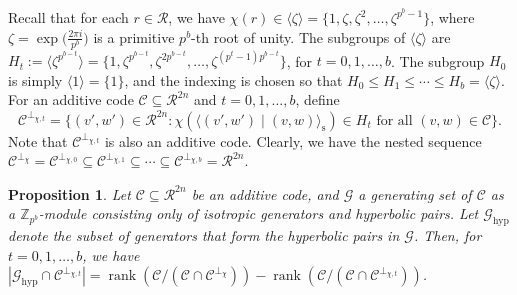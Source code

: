 \documentclass{article}
\DeclareMathOperator{\rank}{rank}
\newtheorem{prop}{Proposition}[section]
\theoremstyle{remark}
\theoremstyle{definition}
\numberwithin{equation}{section}
\begin{document}
Recall that for each $r \in \mathcal{R}$, we have $\chi(r)\in \langle \zeta \rangle=\{1,\zeta,\zeta^2,\ldots,\zeta^{p^b-1}\}$, where $\zeta = \exp\bigl(\frac{2 \pi i}{p^b}\bigr)$ is a primitive $p^b$-th root of unity. The subgroups of $\langle \zeta \rangle$ are $H_t := \langle \zeta^{p^{b-t}} \rangle = \{1,\zeta^{p^{b-t}},\zeta^{2p^{b-t}},\ldots,\zeta^{(p^{t}-1)p^{b-t}}\}$, for $t = 0,1,\ldots,b$.  The subgroup $H_0$ is simply $\langle 1 \rangle = \{1\}$, and the indexing is chosen so that $H_0 \le H_1 \leq \cdots \le H_b = \langle \zeta \rangle$. For an additive code $\mathcal{C} \subseteq \mathcal{R}^{2n}$ and $t = 0,1,\ldots,b$, define
\begin{equation}
\mathcal{C}^{\perp_{\chi,t}} = \{(v',w') \in \mathcal{R}^{2n}: \chi(\langle(v',w') \mid (v,w) \rangle_{\text{s}}) \in H_t \text{ for all } (v,w) \in \mathcal{C}\}.
\label{def:perp_t}
\end{equation}
Note that $\mathcal{C}^{\perp_{\chi,t}}$ is also an additive code. Clearly, we have the nested sequence $\mathcal{C}^{\perp_\chi} = \mathcal{C}^{\perp_{\chi,0}} \subseteq \mathcal{C}^{\perp_{\chi,1}} \subseteq \cdots \subseteq \mathcal{C}^{\perp_{\chi,b}} = \mathcal{R}^{2n}$.


\begin{prop}\label{prop:count} 
Let $\mathcal{C} \subseteq \mathcal{R}^{2n}$ be an additive code, and $\mathcal{G}$ a generating set of $\mathcal{C}$ as a $\mathbb{Z}_{p^b}$-module consisting only of isotropic generators and hyperbolic pairs. Let $\mathcal{G}_{\mathrm{hyp}}$ denote the subset of generators that form the hyperbolic pairs in $\mathcal{G}$. Then, for $t = 0,1,\ldots,b$, we have $\left|\mathcal{G}_{\mathrm{hyp}} \cap \mathcal{C}^{\perp_{\chi,t}}\right| = \rank(\mathcal{C} / (\mathcal{C} \cap \mathcal{C}^{\perp_{\chi}})) - \rank(\mathcal{C} / (\mathcal{C} \cap \mathcal{C}^{\perp_{\chi,t}}))$.
\end{prop}
\end{document}
